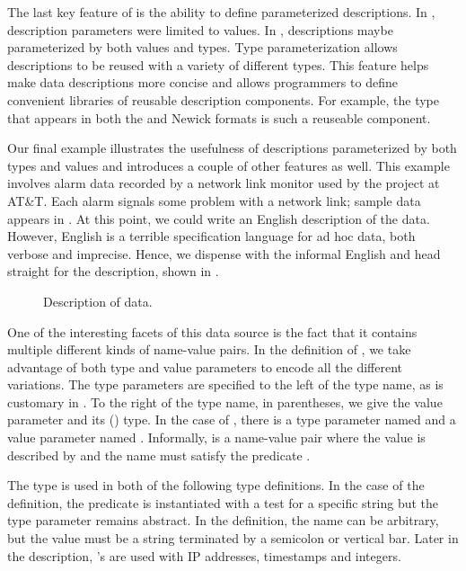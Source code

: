 The last key feature of \padsml{} is the ability to define
parameterized descriptions.  In \padsc, description parameters were
limited to values.  In \padsml, descriptions maybe parameterized by
both values and types.  Type parameterization allows descriptions to
be reused with a variety of different types.  This feature helps make
data descriptions more concise and allows programmers to define
convenient libraries of reusable description components. For example,
the  type that appears in both the \dibbler{} and Newick
formats is such a reuseable component.

Our final example illustrates the usefulness of descriptions
parameterized by both types and values and introduces a couple of other
features as well. 
This example involves alarm data recorded by a network link monitor
used by the \darkstar{} project at AT\&T.  Each alarm signals some
problem with a network link; sample data appears in .
At this point, we could write an English description
of the \darkstar{} data. However, English is a terrible specification
language for ad hoc data, both verbose and imprecise.
Hence, we dispense with the informal
English and head straight for the \padsml{} description,
shown in .

\begin{figure}
  \centering
  
  \caption{Description of \darkstar{} data.}
  \label{fig:darkstar-ml}
\end{figure}

One of the interesting facets of this data source is the fact that it
contains multiple different kinds of name-value pairs.  In the
definition of , we take advantage of both type
and value parameters to encode all the different
variations. The type parameters are specified to the left of the type
name, as is customary in \ml{}.  To the right of the type name, in
parentheses, we give the value parameter and its (\ml{}) type.  In
the case of , there is a type parameter named  and
a value parameter named .  Informally,  is a
name-value pair where the value is described by  and the
name must satisfy the predicate .

The  type is used in both of the following type definitions.
In the case of the  definition, the predicate is instantiated
with a test for a specific string but the type parameter remains
abstract.  In the  definition, the name can be arbitrary,
but the value must be a string terminated by a semicolon or vertical
bar. Later in the description, 's are used with IP addresses,
timestamps and integers.


